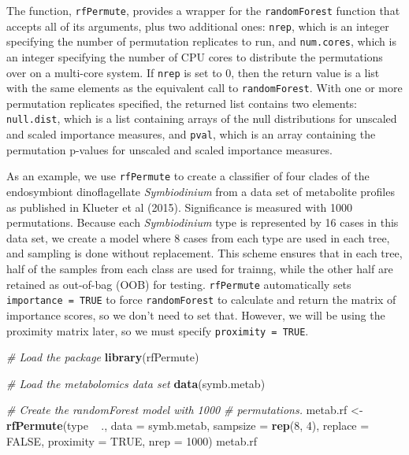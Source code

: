 \documentclass[]{article}
\newenvironment{Shaded}{\begin{snugshade}}{\end{snugshade}}
\newcommand{\KeywordTok}[1]{\textcolor[rgb]{0.13,0.29,0.53}{\textbf{{#1}}}}
\newcommand{\DataTypeTok}[1]{\textcolor[rgb]{0.13,0.29,0.53}{{#1}}}
\newcommand{\DecValTok}[1]{\textcolor[rgb]{0.00,0.00,0.81}{{#1}}}
\newcommand{\StringTok}[1]{\textcolor[rgb]{0.31,0.60,0.02}{{#1}}}
\newcommand{\CommentTok}[1]{\textcolor[rgb]{0.56,0.35,0.01}{\textit{{#1}}}}
\newcommand{\OtherTok}[1]{\textcolor[rgb]{0.56,0.35,0.01}{{#1}}}
\newcommand{\NormalTok}[1]{{#1}}
\begin{document}
The function, \texttt{rfPermute}, provides a wrapper for the
\texttt{randomForest} function that accepts all of its arguments, plus
two additional ones: \texttt{nrep}, which is an integer specifying the
number of permutation replicates to run, and \texttt{num.cores}, which
is an integer specifying the number of CPU cores to distribute the
permutations over on a multi-core system. If \texttt{nrep} is set to 0,
then the return value is a list with the same elements as the equivalent
call to \texttt{randomForest}. With one or more permutation replicates
specified, the returned list contains two elements: \texttt{null.dist},
which is a list containing arrays of the null distributions for unscaled
and scaled importance measures, and \texttt{pval}, which is an array
containing the permutation p-values for unscaled and scaled importance
measures.

As an example, we use \texttt{rfPermute} to create a classifier of four
clades of the endosymbiont dinoflagellate \emph{Symbiodinium} from a
data set of metabolite profiles as published in Klueter et al (2015).
Significance is measured with 1000 permutations. Because each
\emph{Symbiodinium} type is represented by 16 cases in this data set, we
create a model where 8 cases from each type are used in each tree, and
sampling is done without replacement. This scheme ensures that in each
tree, half of the samples from each class are used for trainng, while
the other half are retained as out-of-bag (OOB) for testing.
\texttt{rfPermute} automatically sets \texttt{importance\ =\ TRUE} to
force \texttt{randomForest} to calculate and return the matrix of
importance scores, so we don't need to set that. However, we will be
using the proximity matrix later, so we must specify
\texttt{proximity\ =\ TRUE}.

\begin{Shaded}
\begin{Highlighting}[]
\CommentTok{# Load the package}
\KeywordTok{library}\NormalTok{(rfPermute)}
\end{Highlighting}
\end{Shaded}

\begin{Shaded}
\begin{Highlighting}[]
\CommentTok{# Load the metabolomics data set}
\KeywordTok{data}\NormalTok{(symb.metab)}

\CommentTok{# Create the randomForest model with 1000}
\CommentTok{# permutations.}
\NormalTok{metab.rf <-}\StringTok{ }\KeywordTok{rfPermute}\NormalTok{(type ~}\StringTok{ }\NormalTok{., }\DataTypeTok{data =} \NormalTok{symb.metab, }
    \DataTypeTok{sampsize =} \KeywordTok{rep}\NormalTok{(}\DecValTok{8}\NormalTok{, }\DecValTok{4}\NormalTok{), }\DataTypeTok{replace =} \OtherTok{FALSE}\NormalTok{, }\DataTypeTok{proximity =} \OtherTok{TRUE}\NormalTok{, }
    \DataTypeTok{nrep =} \DecValTok{1000}\NormalTok{)}
\NormalTok{metab.rf}
\end{Highlighting}
\end{Shaded}
\end{document}

